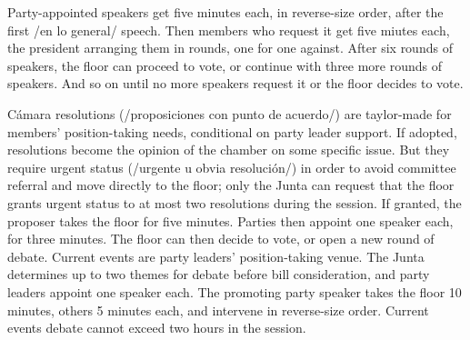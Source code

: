 Party-appointed speakers get five minutes each, in reverse-size order, after the first /en lo general/ speech. Then members who request it get five miutes each, the president arranging them in rounds, one for one against. After six rounds of speakers, the floor can proceed to vote, or continue with three more rounds of speakers. And so on until no more speakers request it or the floor decides to vote.




Cámara resolutions (/proposiciones con punto de acuerdo/) are taylor-made for members' position-taking needs, conditional on party leader support. If adopted, resolutions become the opinion of the chamber on some specific issue. But they require urgent status (/urgente u obvia resolución/) in order to avoid committee referral and move directly to the floor; only the Junta can request that the floor grants urgent status to at most two resolutions during the session. If granted, the proposer takes the floor for five minutes. Parties then appoint one speaker each, for three minutes. The floor can then decide to vote, or open a new round of debate. Current events are party leaders' position-taking venue. The Junta determines up to two themes for debate before bill consideration, and party leaders appoint one speaker each. The promoting party speaker takes the floor 10 minutes, others 5 minutes each, and intervene in reverse-size order. Current events debate cannot exceed two hours in the session. 


